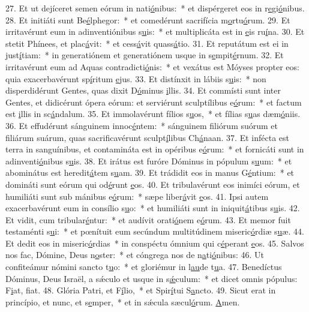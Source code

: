 27. Et ut dejíceret semen eórum in nati\uline{ó}nibus:~* et dispérgeret eos in r\uline{e}gi\uline{ó}nibus.
28. Et initiáti sunt Be\uline{é}lphegor:~* et comedérunt sacrifícia m\uline{o}rtu\uline{ó}rum.
29. Et irritavérunt eum in adinventiónibus s\uline{u}is:~* et multiplicáta est in \uline{e}is ru\uline{í}na.
30. Et stetit Phínees, et plac\uline{á}vit:~* et cess\uline{á}vit quass\uline{á}tio.
31. Et reputátum est ei in just\uline{í}tiam:~* in generatiónem et generatiónem usque in s\uline{e}mpit\uline{é}rnum.
32. Et irritavérunt eum ad Aquas contradicti\uline{ó}nis:~* et vexátus est Móyses propter eos: quia exacerbavérunt sp\uline{í}ritum \uline{e}jus.
33. Et distínxit in lábiis s\uline{u}is:~* non disperdidérunt Gentes, quas dixit D\uline{ó}minus \uline{i}llis.
34. Et commísti sunt inter Gentes, et didicérunt ópera eórum: et serviérunt sculptílibus e\uline{ó}rum:~* et factum est \uline{i}llis in sc\uline{á}ndalum.
35. Et immolavérunt fílios s\uline{u}os,~* et fílias s\uline{u}as dæm\uline{ó}niis.
36. Et effudérunt sánguinem innoc\uline{é}ntem:~* sánguinem filiórum suórum et filiárum suárum, quas sacrificavérunt sculpt\uline{í}libus Ch\uline{á}naan.
37. Et infécta est terra in sanguínibus, et contamináta est in opéribus e\uline{ó}rum:~* et fornicáti sunt in adinventi\uline{ó}nibus s\uline{u}is.
38. Et irátus est furóre Dóminus in pópulum s\uline{u}um:~* et abominátus est heredit\uline{á}tem s\uline{u}am.
39. Et trádidit eos in manus G\uline{é}ntium:~* et domináti sunt eórum qui od\uline{é}runt \uline{e}os.
40. Et tribulavérunt eos inimíci eórum, et humiliáti sunt sub mánibus e\uline{ó}rum:~* sæpe liber\uline{á}vit \uline{e}os.
41. Ipsi autem exacerbavérunt eum in consílio s\uline{u}o:~* et humiliáti sunt in iniquit\uline{á}tibus s\uline{u}is.
42. Et vidit, cum tribular\uline{é}ntur:~* et audívit orati\uline{ó}nem e\uline{ó}rum.
43. Et memor fuit testaménti s\uline{u}i:~* et pœnítuit eum secúndum multitúdinem miseric\uline{ó}rdiæ s\uline{u}æ.
44. Et dedit eos in miseric\uline{ó}rdias~* in conspéctu ómnium qui c\uline{é}perant \uline{e}os.
45. Salvos nos fac, Dómine, Deus n\uline{o}ster:~* et cóngrega nos de n\uline{a}ti\uline{ó}nibus:
46. Ut confiteámur nómini sancto t\uline{u}o:~* et gloriémur in l\uline{au}de t\uline{u}a.
47. Benedíctus Dóminus, Deus Israël, a sǽculo et usque in s\uline{ǽ}culum:~* et dicet omnis pópulus: F\uline{i}at, f\uline{i}at.
48. Glória Patri, et F\uline{í}lio,~* et Spir\uline{í}tui S\uline{a}ncto.
49. Sicut erat in princípio, et nunc, et s\uline{e}mper,~* et in sǽcula sæcul\uline{ó}rum. \uline{A}men.
